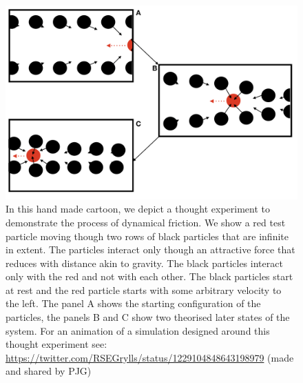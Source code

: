 \begin{figure}[h!]
    \centering
    \includegraphics[width = \linewidth]{Figures/Chapter2/Dynamical_Friction.png}
    \caption{In this hand made cartoon, we depict a thought experiment to demonstrate the process of dynamical friction. We show a red test particle moving though two rows of black particles that are infinite in extent. The particles interact only though an attractive force that reduces with distance akin to gravity. The black particles interact only with the red and not with each other. The black particles start at rest and the red particle starts with some arbitrary velocity to the left. The panel A shows the starting configuration of the particles, the panels B and C show two theorised later states of the system. For an animation of a simulation designed around this thought experiment see: \url{https://twitter.com/RSEGrylls/status/1229104848643198979} (made and shared by PJG)}
    \label{fig:Tdyn_toon}
\end{figure}


